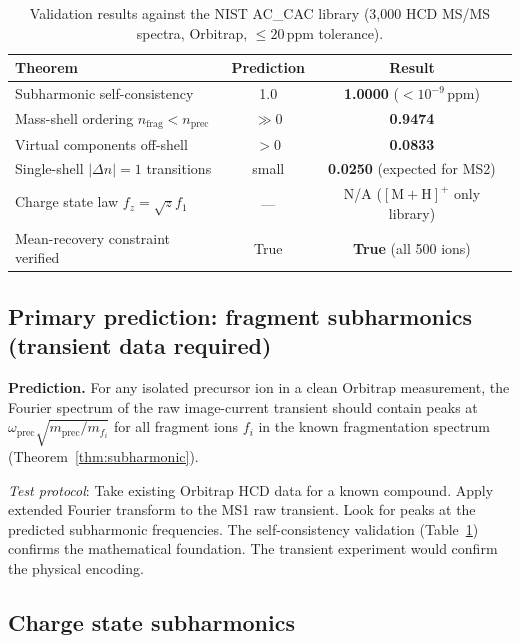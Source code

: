 \documentclass[twocolumn,10pt,a4paper]{article}
\theoremstyle{thmstyle}
\theoremstyle{definition}
\theoremstyle{remark}
\begin{document}
\begin{table}[h]
\centering
\caption{Validation results against the NIST AC\_CAC library
         (3{,}000 HCD MS/MS spectra, Orbitrap, $\leq 20$\,ppm tolerance).}
\label{tab:validation_phasecoherence}
\small
\begin{tabular}{lcc}
\toprule
\textbf{Theorem} & \textbf{Prediction} & \textbf{Result} \\
\midrule
Subharmonic self-consistency
  & 1.0
  & \textbf{1.0000} ($<10^{-9}$\,ppm) \\
Mass-shell ordering $n_{\text{frag}} < n_{\text{prec}}$
  & $\gg 0$
  & \textbf{0.9474} \\
Virtual components off-shell
  & $> 0$
  & \textbf{0.0833} \\
Single-shell $|\Delta n|=1$ transitions
  & small
  & \textbf{0.0250} (expected for MS2) \\
Charge state law $f_z = \sqrt{z}f_1$
  & ---
  & N/A ($[\mathrm{M+H}]^+$ only library) \\
Mean-recovery constraint verified
  & True
  & \textbf{True} (all 500 ions) \\
\bottomrule
\end{tabular}
\end{table}

\subsection{Primary prediction: fragment subharmonics (transient data required)}

\textbf{Prediction.} For any isolated precursor ion in a clean
Orbitrap measurement, the Fourier spectrum of the raw image-current transient
should contain peaks at
$\omega_{\text{prec}}\sqrt{m_{\text{prec}}/m_{f_i}}$ for all fragment
ions $f_i$ in the known fragmentation spectrum (Theorem~\ref{thm:subharmonic}).

\textit{Test protocol}: Take existing Orbitrap HCD data for a known
compound. Apply extended Fourier transform to the MS1 raw transient.
Look for peaks at the predicted subharmonic frequencies. The
self-consistency validation (Table~\ref{tab:validation_phasecoherence})
confirms the mathematical foundation. The transient experiment would
confirm the physical encoding.

\subsection{Charge state subharmonics}
\end{document}
